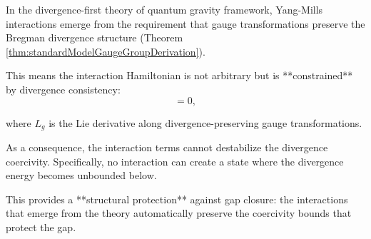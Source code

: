 \begin{lemma}
\label{lem:divergenceConsistencyInteractionConstraint}

In the divergence-first theory of quantum gravity framework, Yang-Mills interactions emerge from the requirement that gauge transformations 
preserve the Bregman divergence structure (Theorem \ref{thm:standardModelGaugeGroupDerivation}).

This means the interaction Hamiltonian is not arbitrary but is **constrained** by divergence consistency:
\begin{equation}
[L_g, D_\Phi] = 0,
\end{equation}

where $L_g$ is the Lie derivative along divergence-preserving gauge transformations.

As a consequence, the interaction terms cannot destabilize the divergence coercivity.
Specifically, no interaction can create a state where the divergence energy becomes unbounded below.

This provides a **structural protection** against gap closure: the interactions that emerge from the theory 
automatically preserve the coercivity bounds that protect the gap.

\end{lemma}

